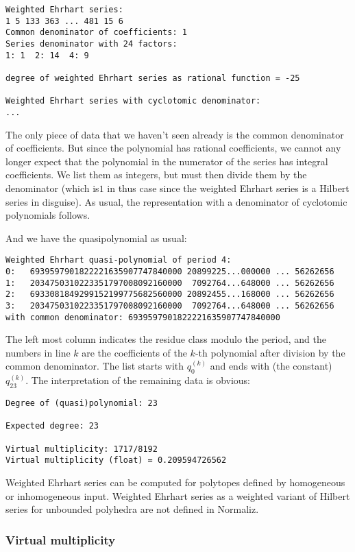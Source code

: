 \begin{Verbatim}
Weighted Ehrhart series:
1 5 133 363 ... 481 15 6
Common denominator of coefficients: 1
Series denominator with 24 factors:
1: 1  2: 14  4: 9

degree of weighted Ehrhart series as rational function = -25

Weighted Ehrhart series with cyclotomic denominator:
...
\end{Verbatim}
The only piece of data that we haven't seen already is the common denominator of coefficients. But since the polynomial has rational coefficients, we cannot any longer expect that the polynomial in the numerator of the series has integral coefficients. We list them as integers, but must then divide them by the denominator (which is$1$ in thus case since the weighted Ehrhart series is a Hilbert series in disguise). As usual, the representation with a denominator of cyclotomic polynomials follows.

And we have the quasipolynomial as usual:

\begin{Verbatim}
Weighted Ehrhart quasi-polynomial of period 4:
0:   6939597901822221635907747840000 20899225...000000 ... 56262656
1:   2034750310223351797008092160000  7092764...648000 ... 56262656
2:   6933081849299152199775682560000 20892455...168000 ... 56262656
3:   2034750310223351797008092160000  7092764...648000 ... 56262656
with common denominator: 6939597901822221635907747840000
\end{Verbatim}

The left most column indicates the residue class modulo the period, and the
numbers in line $k$ are the coefficients of the $k$-th polynomial after
division by the common denominator. The list starts with $q_0^{(k)}$ and ends
with (the constant) $q_{23}^{(k)}$.
The interpretation of the remaining data is obvious:

\begin{Verbatim}
Degree of (quasi)polynomial: 23

Expected degree: 23

Virtual multiplicity: 1717/8192
Virtual multiplicity (float) = 0.209594726562
\end{Verbatim}

Weighted Ehrhart series can be computed for polytopes defined by homogeneous or inhomogeneous input. Weighted Ehrhart series as a weighted variant of Hilbert series for unbounded polyhedra are not defined in Normaliz.


\subsubsection{Virtual multiplicity}

